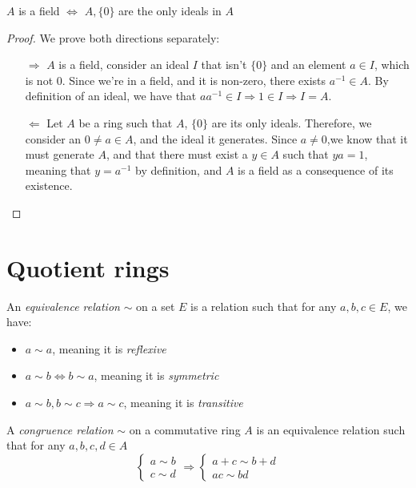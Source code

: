 \begin{theorem*}
  $A$ is a field $\Leftrightarrow$ $A, \{0\}$ are the only ideals in $A$
\end{theorem*}
\begin{proof}
  We prove both directions separately: 
  \begin{itemize}
    \item[$\Rightarrow$] $A$ is a field, consider an ideal $I$ that isn't $\{0\}$ and an element $a \in I$, which is not 0. Since we're in a field, and it is non-zero, there exists $a^{-1} \in A$. By definition of an ideal, we have that $a a^{-1} \in I \Rightarrow 1 \in I \Rightarrow I = A$. 
    \item[$\Leftarrow$] Let $A$ be a ring such that $A$, $\{0\}$ are its only ideals. Therefore, we consider an $0 \neq a \in A$, and the ideal it generates. Since $a \neq 0$,we know that it must generate $A$, and that there must exist a $y \in A$ such that $ya = 1$, meaning that $y = a^{-1}$ by definition, and $A$ is a field as a consequence of its existence.  
  \end{itemize} 
\end{proof}

\section{Quotient rings}

\begin{definition}
  An \emph{equivalence relation} $\sim$ on a set $E$ is a relation such that for any $a, b, c \in E$, we have: 
  \begin{itemize}
    \item $a \sim a$, meaning it is \emph{reflexive}
    \item $a \sim b \Leftrightarrow b \sim a$, meaning it is \emph{symmetric}
    \item $a \sim b, b \sim c \Rightarrow a \sim c$, meaning it is \emph{transitive}
  \end{itemize}

  A \emph{congruence relation} $\sim$ on a commutative ring $A$ is an equivalence relation such that for any $a, b, c, d \in A$
  \[
    \begin{cases}
      a \sim b \\
      c \sim d
    \end{cases} \Rightarrow 
    \begin{cases}
      a + c \sim b + d \\
      ac \sim bd
    \end{cases}
  \]
\end{definition}

